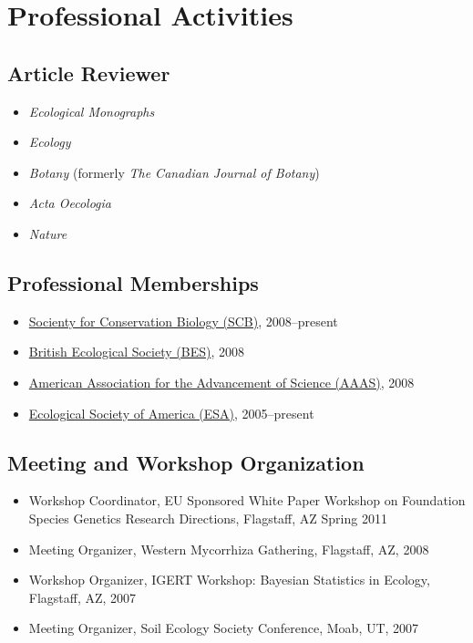 \documentclass[]{article}
\begin{document}
\section{Professional Activities}\label{professional-activities}

\subsection{Article Reviewer}\label{article-reviewer}

\begin{itemize}
\item
  \emph{Ecological Monographs}
\item
  \emph{Ecology}
\item
  \emph{Botany} (formerly \emph{The Canadian Journal of Botany})
\item
  \emph{Acta Oecologia}
\item
  \emph{Nature}
\end{itemize}

\subsection{Professional Memberships}\label{professional-memberships}

\begin{itemize}
\item
  \href{http://www.conbio.org/}{Socienty for Conservation Biology
  (SCB)}, 2008--present
\item
  \href{http://www.aaas.org/}{British Ecological Society (BES)}, 2008
\item
  \href{http://www.aaas.org/}{American Association for the Advancement
  of Science (AAAS)}, 2008
\item
  \href{http://www.esa.org/}{Ecological Society of America (ESA)},
  2005--present
\end{itemize}

\subsection{Meeting and Workshop
Organization}\label{meeting-and-workshop-organization}

\begin{itemize}
\item
  Workshop Coordinator, EU Sponsored White Paper Workshop on Foundation
  Species Genetics Research Directions, Flagstaff, AZ Spring 2011
\item
  Meeting Organizer, Western Mycorrhiza Gathering, Flagstaff, AZ, 2008
\item
  Workshop Organizer, IGERT Workshop: Bayesian Statistics in Ecology,
  Flagstaff, AZ, 2007
\item
  Meeting Organizer, Soil Ecology Society Conference, Moab, UT, 2007
\end{itemize}
\end{document}

